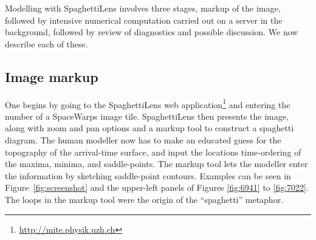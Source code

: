 \documentclass[usenatbib]{mn2e}
\newcommand{\spl}{SpaghettiLens\xspace}
\newcommand{\sw}{SpaceWarps\xspace}
\begin{document}
%
%

Modelling with \spl involves three stages, markup of the image,
followed by intensive numerical computation carried out on a
server in the background, followed by review
of diagnostics and possible discussion.  We now describe each of
these.



\subsection{Image markup}

One begins by going to the \spl web application\footnote{\url{
http://mite.physik.uzh.ch}} and entering the number of a
\sw image tile.  \spl then presents the image, along with zoom and pan
options and a markup tool to construct a spaghetti diagram.  The human
modeller now has to make an educated guess for the topography of the
arrival-time surface, and input the locations time-ordering of the
maxima, minima, and saddle-points.  The markup tool \citep[which is
inspired by Figure~6 of][and is like that figure made interactive and
overlaid on data]{1986ApJ...310..568B} lets the modeller enter the
information by sketching saddle-point contours.  Examples can be seen in Figure~\ref{fig:screenshot} and the upper-left
panels of Figures \ref{fig:6941} to \ref{fig:7022}.  The loops in the
markup tool were the origin of the ``spaghetti'' metaphor.
\end{document}
